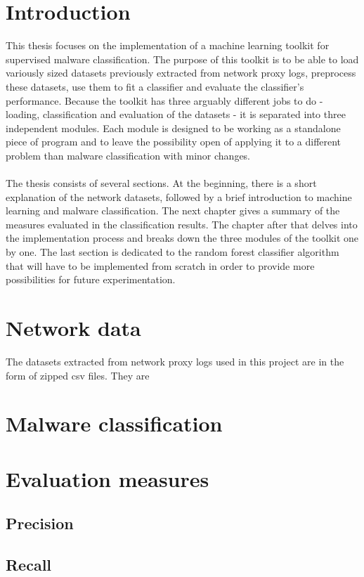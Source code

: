 \documentclass{article}
\begin{document}
  \section*{Introduction}
    This thesis focuses on the implementation of a machine learning toolkit for supervised malware classification. The purpose of this toolkit is to be able to load variously sized datasets previously extracted from network proxy logs, preprocess these datasets, use them to fit a classifier and evaluate the classifier's performance. Because the toolkit has three arguably different jobs to do - loading, classification and evaluation of the datasets - it is separated into three independent modules. Each module is designed to be working as a standalone piece of program and to leave the possibility open of applying it to a different problem than malware classification with minor changes.
  \\~\\
    The thesis consists of several sections. At the beginning, there is a short explanation of the network datasets, followed by a brief introduction to machine learning and malware classification. The next chapter gives a summary of the measures evaluated in the classification results. The chapter after that delves into the implementation process and breaks down the three modules of the toolkit one by one. The last section is dedicated to the random forest classifier algorithm that will have to be implemented from scratch in order to provide more possibilities for future experimentation.
  \newpage
  \section{Network data}
    The datasets extracted from network proxy logs used in this project are in the form of zipped csv files. They are 
  \newpage
  \section{Malware classification}
  \newpage
  \section{Evaluation measures}
    \subsection{Precision}
    \newpage
    \subsection{Recall}
  \newpage
\end{document}
